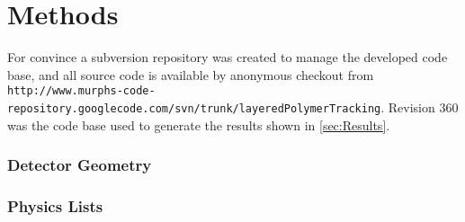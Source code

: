 \section{Methods}
\label{sec:Methods}

For convince a subversion repository was created to manage the developed code base, and all source code is available by anonymous checkout from \verb+http://www.murphs-code-repository.googlecode.com/svn/trunk/layeredPolymerTracking+. Revision 360 was the code base used to generate the results shown in \ref{sec:Results}.

\subsubsection{Detector Geometry}

\subsubsection{Physics Lists}

